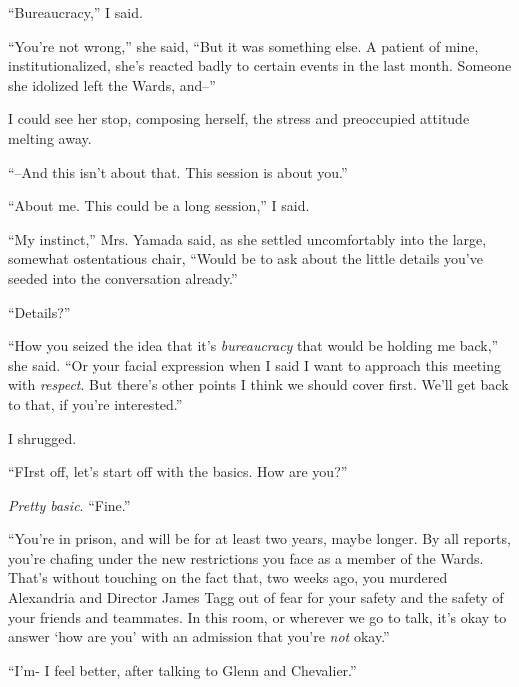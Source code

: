 ``Bureaucracy,'' I said.



``You're not wrong,'' she said, ``But it was something else.  A patient of mine, institutionalized, she's reacted badly to certain events in the last month.  Someone she idolized left the Wards, and--''



I could see her stop, composing herself, the stress and preoccupied attitude melting away.



``--And this isn't about that.  This session is about you.''



``About me.  This could be a long session,'' I said.



``My instinct,'' Mrs. Yamada said, as she settled uncomfortably into the large, somewhat ostentatious chair, ``Would be to ask about the little details you've seeded into the conversation already.''



``Details?''



``How you seized the idea that it's \emph{bureaucracy} that would be holding me back,'' she said.  ``Or your facial expression when I said I want to approach this meeting with \emph{respect}.  But there's other points I think we should cover first.  We'll get back to that, if you're interested.''



I shrugged.



``FIrst off, let's start off with the basics.  How are you?''



\emph{Pretty basic}.  ``Fine.''



``You're in prison, and will be for at least two years, maybe longer.  By all reports, you're chafing under the new restrictions you face as a member of the Wards.  That's without touching on the fact that, two weeks ago, you murdered Alexandria and Director James Tagg out of fear for your safety and the safety of your friends and teammates.  In this room, or wherever we go to talk, it's okay to answer `how are you' with an admission that you're \emph{not} okay.''



``I'm- I feel better, after talking to Glenn and Chevalier.''



